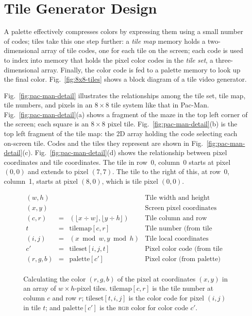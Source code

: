 \documentclass[11pt]{article}
\newcommand{\figref}[1]{Fig.~\ref{fig:#1}}
\begin{document}
\section{Tile Generator Design}

A palette effectively compresses colors by expressing them using a
small number of codes; tiles take this one step further: a \emph{tile
map} memory holds a two-dimensional array of tile codes, one for each
tile on the screen; each code is used to index into memory that holds
the pixel color codes in the \emph{tile set}, a three-dimensional
array.  Finally, the color code is fed to a palette memory to look up
the final color. \figref{8x8-tiles} shows a block diagram of a tile
video generator.

\figref{pac-man-detail} illustrates the relationships among the tile
set, tile map, tile numbers, and pixels in an $8\times8$ tile system
like that in Pac-Man.  \figref{pac-man-detail}(a) shows a fragment of
the maze in the top left corner of the screen; each square is an
$8\times8$ pixel tile.  \figref{pac-man-detail}(b) is the top left
fragment of the tile map: the 2D array holding the code selecting each
on-screen tile.  Codes and the tiles they represent are shown in
\figref{pac-man-detail}(c).  \figref{pac-man-detail}(d) shows the
relationship between pixel coordinates and tile coordinates.  The tile
in row~0, column~0 starts at pixel $(0,0)$ and extends to pixel
$(7,7)$.  The tile to the right of this, at row~0, column~1, starts at
pixel $(8,0)$, which is tile pixel $(0,0)$.

\begin{figure}
\[
\begin{array}{rcll}
  (w,h) & & & \text{Tile width and height (pixels)} \\
  (x,y) & & & \text{Screen pixel coordinates} \\
  (c,r) & = & (\lfloor x \div w \rfloor, \lfloor y \div h \rfloor ) &
  \text{Tile column and row (tiles)} \\
  t & = & \text{tilemap}[c,r] &
  \text{Tile number (from tile map)} \\
  (i,j) & = & (x \bmod w, y \bmod h) &
  \text{Tile local coordinates (pixels)} \\
  c' & = & \text{tileset}[i,j,t] &
  \text{Pixel color code (from tile set)} \\
  (r,g,b) & = & \text{palette}[c'] &
  \text{Pixel color (from palette)} \\
\end{array}
\]
\caption{Calculating the color $(r,g,b)$ of the pixel at coordinates
  $(x,y)$ in an array of $w \times h$-pixel tiles.
  $\text{tilemap}[c,r]$ is the tile number at column $c$ and row $r$;
  $\text{tileset}[t,i,j]$ is the color code for pixel $(i,j)$ in tile
  $t$; and $\text{palette}[c']$ is the \textsc{rgb} color for color
  code $c'$.}
\label{fig:summary}
\end{figure}
\end{document}
